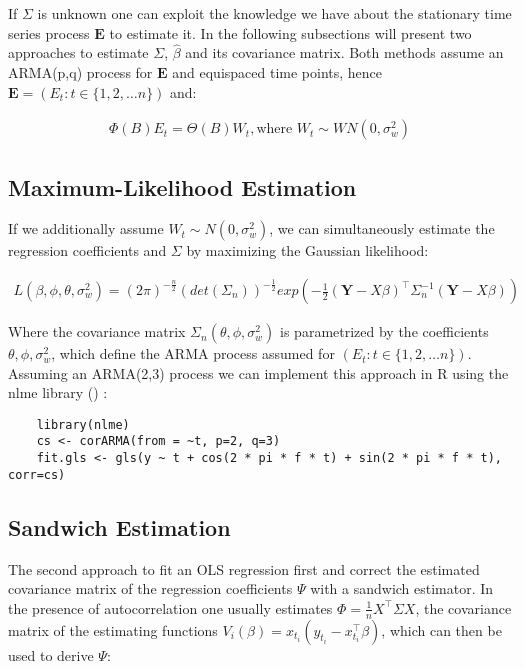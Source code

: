 If $\Sigma$ is unknown one can exploit the knowledge we have about the stationary time series process $\mathbf{E}$ to estimate it.
In the following subsections will present two approaches to estimate $\Sigma$, $\hat \beta $ and its covariance matrix.
Both methods assume an ARMA(p,q) process for $\mathbf{E}$ and equispaced time points,
hence $\mathbf{E} = (E_t: t \in \{1, 2, \dots  n \})$ and:

\begin{gather*}
    \Phi(B)E_t = \Theta(B)W_t, \text{where $W_t \sim WN(0, \sigma_w^2)$}
\end{gather*}


\subsection{Maximum-Likelihood Estimation}\label{subsec:maximum-likelihood-estimation}

If we additionally assume $W_t \sim N(0, \sigma_w^2)$, we can simultaneously estimate the regression coefficients and $\Sigma$ by
maximizing the Gaussian likelihood:

\begin{gather*}
    L(\beta, \phi, \theta, \sigma_w^2) = (2 \pi)^{-\frac{n}{2}} (det(\Sigma_n))^{-\frac{1}{2}} exp(-\frac{1}{2}
    (\mathbf{Y}-X\beta)^{\top} \Sigma_n^{-1}(\mathbf{Y}-X\beta))
\end{gather*}

Where the covariance matrix $\Sigma_n(\theta, \phi, \sigma_w^2)$ is parametrized by the coefficients $\theta, \phi, \sigma_w^2$, which
define the ARMA process assumed for $(E_t: t \in \{1, 2, \dots  n \})$.
Assuming an ARMA(2,3) process we can implement this approach in R using the nlme library (\citeauthor{box_time_1994})
:
\begin{verbatim}
    library(nlme)
    cs <- corARMA(from = ~t, p=2, q=3)
    fit.gls <- gls(y ~ t + cos(2 * pi * f * t) + sin(2 * pi * f * t), corr=cs)
\end{verbatim}


\subsection{Sandwich Estimation}
The second approach to fit an OLS regression first and correct the estimated covariance matrix of the regression coefficients $\Psi$ with a
sandwich estimator.
In the presence of autocorrelation one usually estimates $\Phi = \frac{1}{n} X^{\top} \Sigma X$,
the covariance matrix of the estimating functions
$V_i(\beta) = x_{t_i}(y_{t_i} - x_{t_i}^{\top}\beta)$, which can then be used to derive $\Psi$:

